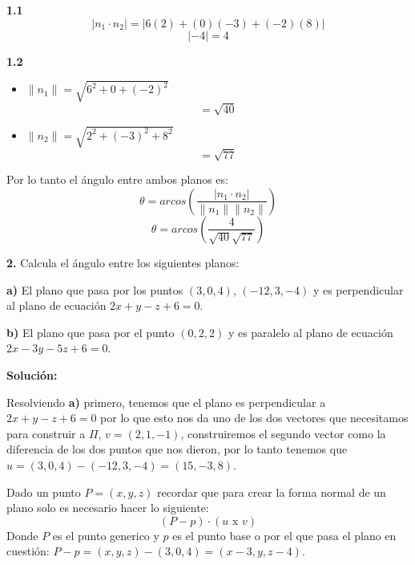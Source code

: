 \documentclass{article}
\begin{document}
\hspace*{-1cm}\begin{minipage}[c]{0.5cm}
   \textbf{1.1}
   $$\left| n_1 \cdot n_2\right| = \left|6(2)+(0)(-3)+(-2)(8)\right|$$
   $$\left|-4\right| = 4$$
\end{minipage}\hspace*{6cm}\begin{minipage}[c]{8cm}
   \textbf{1.2}
   \vspace{10pt}
   \begin{itemize}
       \item$\|n_1\| = \sqrt{6^2+0+(-2)^2}$
       $$=\sqrt{40}$$
       \item $\|n_2\| = \sqrt{2^2+(-3)^2+8^2}$
       $$= \sqrt{77}$$
   \end{itemize}
\end{minipage}


Por lo tanto el ángulo entre ambos planos es:
$$\theta = arcos\left(\frac{\left|n_1\cdot n_2\right|}{\|n_1\|\|n_2\|}\right)$$
$$\theta = arcos\left(\frac{4}{\sqrt{40}\sqrt{77}}\right)$$
\vspace*{10pt}


\textbf{2.} Calcula el ángulo entre los siguientes planos:
\vspace*{10pt}


\begin{center}
   \begin{minipage}[c]{12cm}
       \textbf{a)} El plano que pasa por los puntos $(3, 0, 4)$, $(-12, 3, -4)$ y es
       perpendicular al plano de ecuación $2x + y - z + 6 = 0$.
       \vspace{10pt}
      
       \textbf{b)} El plano que pasa por el punto $(0,2,2)$ y es paralelo al plano de ecuación
       $2x - 3y - 5z + 6 = 0$.
   \end{minipage}
\end{center}
\vspace{10pt}


\textbf{Solución:}
\vspace{10pt}


Resolviendo \textbf{a)} primero, tenemos que el plano es perpendicular a $2x + y - z + 6 = 0$ por lo que esto nos da uno de los dos
vectores que necesitamos para construir a $\Pi$, $v =(2,1,-1)$, construiremos el segundo vector como la diferencia de los dos puntos que nos dieron,
por lo tanto tenemos que $u =(3,0,4) -(-12,3,-4) =(15,-3, 8)$.


Dado un punto $P =(x,y,z)$ recordar que para crear la forma normal de un plano solo es necesario hacer lo siguiente:
$$(P-p)\cdot(u \text{ x } v)$$
Donde $P$ es el punto generico y $p$ es el punto base o por el que pasa el plano en cuestión: $P-p =(x,y,z)-(3,0,4) = (x-3,y,z-4)$.
\end{document}
